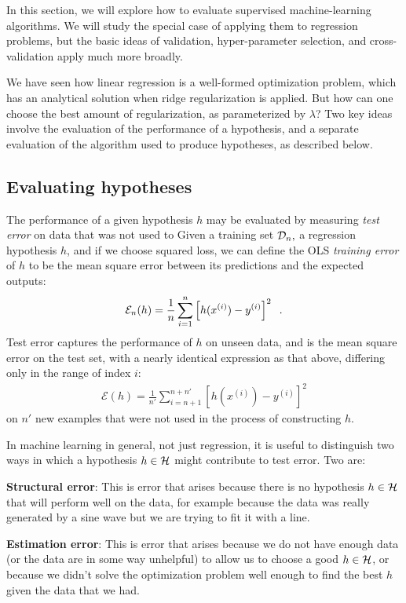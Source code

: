 In this section, we will explore how to evaluate supervised
machine-learning algorithms.  We will study the special case of
applying them to regression problems, but the basic ideas of
validation, hyper-parameter selection, and cross-validation apply much
more
broadly.

We have seen how linear regression is a well-formed optimization
problem, which has an analytical solution when ridge regularization is
applied.  But how can one choose the best amount of regularization, as
parameterized by $\lambda$?  Two key ideas involve the evaluation of
the performance of a hypothesis, and a separate evaluation of the
algorithm used to produce hypotheses, as described below.

\subsection{Evaluating hypotheses}

The performance of a given hypothesis $h$ may be evaluated by
measuring {\em test error} on data that was not used to
%
%
Given a training set ${\cal D}_n,$ a regression hypothesis $h$, and if we choose squared loss, we can define the OLS {\em{training error}} of $h$ to be the mean square error between its predictions and the expected outputs:
\begin{eqnarray*}
  \mathcal{E}_n(h) = \frac{1}{n}\sum_{i = 1}^{n} \left[ h(x^{(i)}) - y^{(i)} \right]^2
  \;\;.
\end{eqnarray*}
Test error captures the performance of $h$ on unseen data, and is the
mean square error on the test set, with a nearly identical expression
as that above, differing only in the range of index $i$:
\begin{eqnarray*}
  \mathcal{E}(h) = \frac{1}{n'}\sum_{i = n + 1}^{n + n'} \left[ h(x^{(i)}) - y^{(i)} \right]^2
\end{eqnarray*}
on $n'$ new examples that were not used in the process of constructing $h$.

In machine learning in general, not just regression, it is useful to
distinguish two ways in which a hypothesis $h \in {\cal H}$ might
contribute to test error. Two are:
\begin{description}
  \item{\bf Structural error}: This is error that arises because there
        is no hypothesis $h \in {\cal H}$ that will perform well on the data,
        for example because the data was really generated by a sine wave but
        we are trying to fit it with a line.
  \item{\bf Estimation  error}:  This is error that arises because we
        do not have enough data (or the data are in some way unhelpful) to
        allow us to choose a good $h \in {\cal H}$, or because we didn't
        solve the optimization problem well enough to find the best $h$
        given the data that we had.
\end{description}

